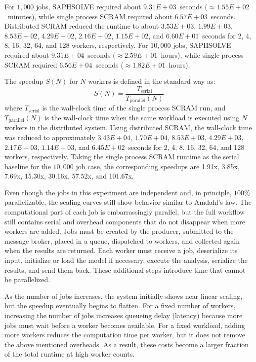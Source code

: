 For $1{,}000$ jobs, SAPHSOLVE required about $9.31E+03$~seconds ($\approx 1.55E+02$~minutes), while single process SCRAM required about $6.57E+03$~seconds. Distributed SCRAM reduced the runtime to about $3.53E+03$, $1.99E+03$, $8.53E+02$, $4.29E+02$, $2.16E+02$, $1.15E+02$, and $6.60E+01$~seconds for 2, 4, 8, 16, 32, 64, and 128 workers, respectively. For $10{,}000$ jobs, SAPHSOLVE required about $9.31E+04$~seconds ($\approx 2.59E+01$~hours), while single process SCRAM required $6.56E+04$~seconds ($\approx 1.82E+01$~hours).

The speedup $S(N)$ for $N$ workers is defined in the standard way as:
\begin{equation}
  S(N) = \frac{T_{\text{serial}}}{T_{\text{parallel}}(N)}
\end{equation}
where $T_{\text{serial}}$ is the wall-clock time of the single process SCRAM run, and $T_{\text{parallel}}(N)$ is the wall-clock time when the same workload is executed using $N$ workers in the distributed system. Using distributed SCRAM, the wall-clock time was reduced to approximately $3.43E+04$, $1.70E+04$, $8.53E+03$, $4.29E+03$, $2.17E+03$, $1.14E+03$, and $6.45E+02$~seconds for 2, 4, 8, 16, 32, 64, and 128 workers, respectively. Taking the single process SCRAM runtime as the serial baseline for the $10{,}000$ job case, the corresponding speedups are 1.91x, 3.85x, 7.69x, 15.30x, 30.16x, 57.52x, and 101.67x.

Even though the jobs in this experiment are independent and, in principle, $100\%$ parallelizable, the scaling curves still show behavior similar to Amdahl's law. The computational part of each job is embarrassingly parallel, but the full workflow still contains serial and overhead components that do not disappear when more workers are added. Jobs must be created by the producer, submitted to the message broker, placed in a queue, dispatched to workers, and collected again when the results are returned. Each worker must receive a job, deserialize its input, initialize or load the model if necessary, execute the analysis, serialize the results, and send them back. These additional steps introduce time that cannot be parallelized.

As the number of jobs increases, the system initially shows near linear scaling, but the speedup eventually begins to flatten. For a fixed number of workers, increasing the number of jobs increases queueing delay (latency) because more jobs must wait before a worker becomes available. For a fixed workload, adding more workers reduces the computation time per worker, but it does not remove the above mentioned overheads. As a result, these costs become a larger fraction of the total runtime at high worker counts.

